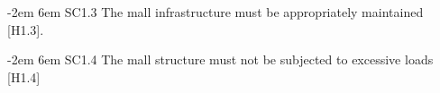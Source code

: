 \documentclass[12pt]{article}
\begin{document}
{\parindent -2em
\leftskip 6em
SC1.3 The mall infrastructure must be appropriately maintained [H1.3].

}

{\parindent -2em
\leftskip 6em
SC1.4 The mall structure must not be subjected to excessive loads [H1.4]

}




















\end{document}
